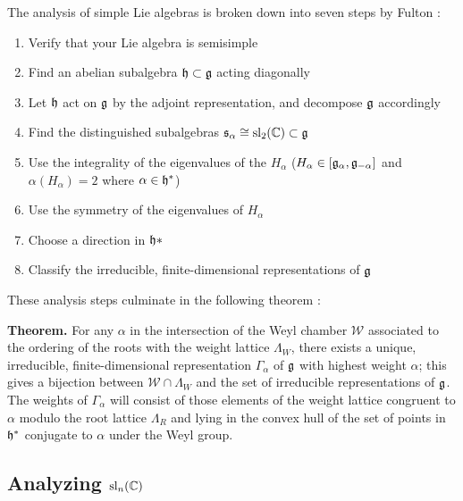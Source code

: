 \documentclass[11pt, a4paper, oneside]{article}
\theoremstyle{plain}
\theoremstyle{definition}
\theoremstyle{example}
\begin{document}
The analysis of simple Lie algebras is broken down into seven steps by Fulton \cite[\S 14.1]{fulton}:
\begin{enumerate}
\item Verify that your Lie algebra is semisimple
\item Find an abelian subalgebra $\mathfrak{h} \subset \mathfrak{g}$ acting diagonally
\item Let $\mathfrak{h}$ act on $\mathfrak{g}$ by the adjoint representation, and decompose $\mathfrak{g}$ accordingly
\item Find the distinguished subalgebras $\mathfrak{s}_{\alpha} \cong \mathrm{sl}_2(\mathbb{C}) \subset \mathfrak{g}$
\item Use the integrality of the eigenvalues of the $H_{\alpha}$ ($H_{\alpha} \in [\mathfrak{g}_{\alpha}, \mathfrak{g}_{-\alpha}]$ and $\alpha(H_{\alpha}) = 2$ where $\alpha \in \mathfrak{h}^*$)
\item Use the symmetry of the eigenvalues of $H_{\alpha}$
\item Choose a direction in $\mathfrak{h}*$
\item Classify the irreducible, finite-dimensional representations of $\mathfrak{g}$
\end{enumerate}

These analysis steps culminate in the following theorem \cite[\S 14.1, Theorem 14.18]{fulton}:

\par
\textbf{Theorem.} For any $\alpha$ in the intersection of the Weyl chamber $\mathcal{W}$ associated to the ordering of the roots with the weight lattice $\Lambda_W$, there exists a unique, irreducible, finite-dimensional representation $\Gamma_{\alpha}$ of $\mathfrak{g}$ with highest weight $\alpha$; this gives a bijection between $\mathcal{W} \cap \Lambda_W$ and the set of irreducible representations of $\mathfrak{g}$. The weights of $\Gamma_{\alpha}$ will consist of those elements of the weight lattice congruent to $\alpha$ modulo the root lattice $\Lambda_R$ and lying in the convex hull of the set of points in $\mathfrak{h}^*$ conjugate to $\alpha$ under the Weyl group.

\subsection{Analyzing $\mathrm{sl}_n(\mathbb{C})$}
\end{document}
